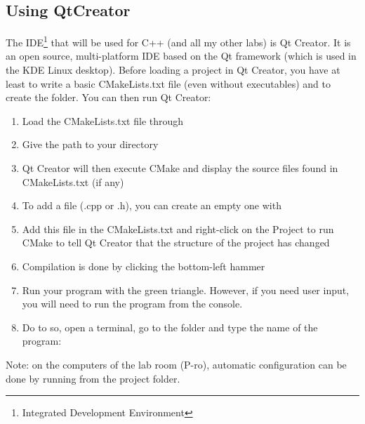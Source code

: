 \documentclass{ecnreport}
\begin{document}
\subsection{Using QtCreator}

The IDE\footnote{Integrated Development Environment} that will be used for C++ (and all my other labs) is Qt Creator. It is an open source, multi-platform IDE based on the Qt framework (which is used in the KDE Linux desktop). 
Before loading a project in Qt Creator, you have at least to write a basic CMakeLists.txt file (even without executables) and to create the  folder. You can then run Qt Creator:
\begin{enumerate}
	\item Load the CMakeLists.txt file through 
	\item Give the path to your  directory
	\item Qt Creator will then execute CMake and display the source files found in CMakeLists.txt (if any)
	\item To add a file (.cpp or .h), you can create an empty one with 
	\item Add this file in the CMakeLists.txt and right-click on the Project to run CMake to tell Qt Creator that the structure of the project has changed
	\item Compilation is done by clicking the bottom-left hammer
	\item Run your program with the green triangle. However, if you need user input, you will need to run the program from the console.
	\item Do to so, open a terminal, go to the  folder and type the name of the program: 
\end{enumerate}

Note: on the computers of the lab room (P-ro), automatic configuration can be done by running  from the project folder.

\end{document}
